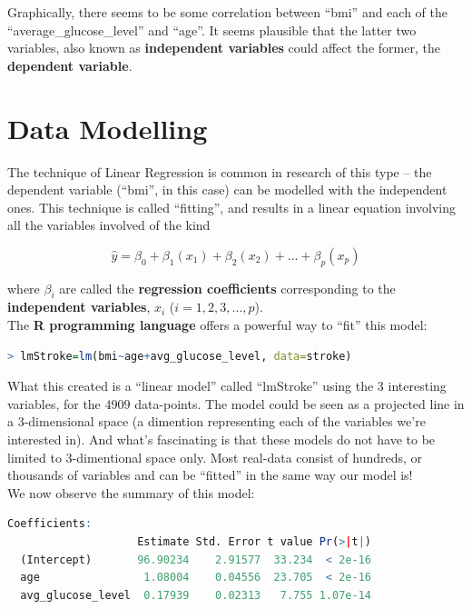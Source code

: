 \documentclass{article}
\begin{document}
Graphically, there seems to be some correlation between ``bmi''
and each of the ``average\_glucose\_level'' and ``age''. It seems plausible
that the latter two variables, also known as \textbf{independent variables}
could affect the former, the \textbf{dependent variable}.
\pagebreak

\section*{Data Modelling}
The technique of Linear Regression is common in research of this type
– the dependent variable (``bmi'', in this case) can be modelled
with the independent ones. This technique is called ``fitting'',
and results in a linear equation involving all the variables
involved of the kind

\begin{equation}
  \hat{y} = \beta_0 + \beta_1(x_1) + \beta_2(x_2) + \dots + \beta_p(x_p)
\end{equation}

where $\beta_i$ are called the \textbf{regression coefficients} 
corresponding to the \textbf{independent variables}, $x_i$
($i=1,2,3,\dots,p$).\\

The \textbf{R programming language} offers a powerful way to ``fit''
this model:

\begin{lstlisting}[backgroundcolor = \color{lightgray},language = R]
  > lmStroke=lm(bmi~age+avg_glucose_level, data=stroke)
\end{lstlisting}

What this created is a ``linear model'' called ``lmStroke''
using the 3 interesting variables, for the $4909$ data-points.
The model could be seen as a projected line in a 3-dimensional
space (a dimention representing each of the variables we're 
interested in). And what's fascinating is that these models 
do not have to be limited to 3-dimentional space only.
Most real-data consist of hundreds, or thousands of variables
and can be ``fitted'' in the same way our model is!\\

We now observe the summary of this model:
\begin{lstlisting}[backgroundcolor = \color{lightgray},language = R]
  Coefficients:
                    Estimate Std. Error t value Pr(>|t|)    
  (Intercept)       96.90234    2.91577  33.234  < 2e-16
  age                1.08004    0.04556  23.705  < 2e-16
  avg_glucose_level  0.17939    0.02313   7.755 1.07e-14
\end{lstlisting}
\end{document}
